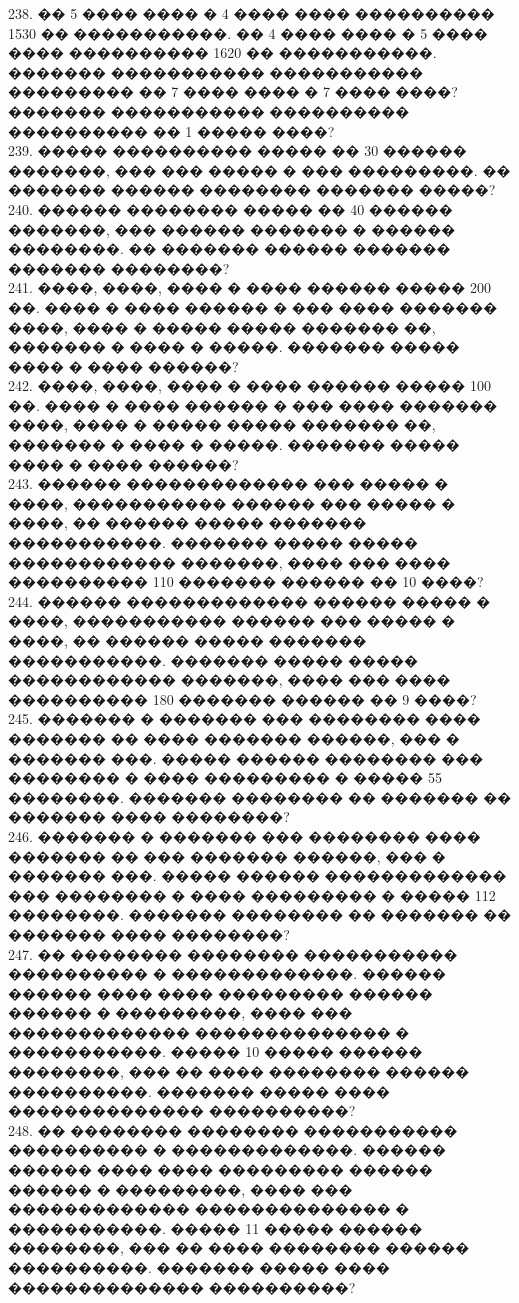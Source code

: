 \documentclass[12pt]{article}
\begin{document}
238. �� 5 ���� ���� � 4 ���� ���� ���������� 1530 �� �����������. �� 4 ���� ���� � 5 ���� ���� ���������� 1620 �� �����������. ������� ����������� ����������� ��������� �� 7 ���� ���� � 7 ���� ����? ������� ����������� ���������� ���������� �� 1 ����� ����?\\
239. ����� ���������� ����� �� 30 ������ �������, ��� ��� ����� � ��� ���������. �� ������� ������ �������� ������� �����?\\
240. ������ �������� ����� �� 40 ������ �������, ��� ������ ������� � ������ ��������. �� ������� ������ ������� ������� ��������?\\
241. ����, ����, ���� � ���� ������  ����� 200 ��. ���� � ���� ������ � ��� ���� ������� ����, ���� � ����� ����� ������� ��, ������� � ���� �  �����. ������� ����� ���� � ���� ������?\\
242. ����, ����, ���� � ���� ������  ����� 100 ��. ���� � ���� ������ � ��� ���� ������� ����, ���� � ����� ����� ������� ��, ������� � ���� �  �����. ������� ����� ���� � ���� ������?\\
243. ������ ������������� ��� ����� � ����, ����������� ������ ��� ����� � ����, �� ������ ����� ������� �����������. ������� ����� ����� ������������ �������, ���� ��� ���� ���������� 110 ������� ������ �� 10 ����?\\
244. ������ ������������� ������ ����� � ����, ����������� ������ ��� ����� � ����, �� ������ ����� ������� �����������. ������� ����� ����� ������������ �������, ���� ��� ���� ���������� 180 ������� ������ �� 9 ����?\\
245. ������� � ������� ��� �������� ���� ������� �� ���� ������� ������, ��� � ������� ���. ����� ������ �������� ��� �������� � ���� ��������� � ����� 55 ��������. ������� �������� �� ������� �� ������� ���� ��������?\\
246. ������� � ������� ��� �������� ���� ������� �� ��� ������� ������, ��� � ������� ���. ����� ������ ������������� ��� �������� � ���� ��������� � ����� 112 ��������. ������� �������� �� ������� �� ������� ���� ��������?\\
247. �� �������� �������� ����������� ���������� � �������������. ������ ������ ���� ���� ��������� ������ ������ � ���������, ���� ��� ������������� �������������� � �����������. ����� 10 ����� ������ ��������, ��� �� ���� �������� ������ ����������. ������� ����� ���� �������������� ����������?\\
248. �� �������� �������� ����������� ���������� � �������������. ������ ������ ���� ���� ��������� ������ ������ � ���������, ���� ��� ������������� �������������� � �����������. ����� 11 ����� ������ ��������, ��� �� ���� �������� ������ ����������. ������� ����� ���� �������������� ����������?\\
\end{document}
